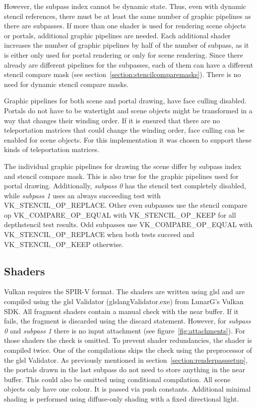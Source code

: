 However, the subpass index cannot be dynamic state. Thus, even with dynamic stencil references, there must be at least the same number of graphic pipelines as there are subpasses. If more than one shader is used for rendering scene objects or portals, additional graphic pipelines are needed. Each additional shader increases the number of graphic pipelines by half of the number of subpass, as it is either only used for portal rendering or only for scene rendering. Since there already are different pipelines for the subpasses, each of them can have a different stencil compare mask (see section~\ref{section:stencilcomparemasks}). There is no need for dynamic stencil compare masks.

Graphic pipelines for both scene and portal drawing, have face culling disabled. Portals do not have to be watertight and scene objects might be transformed in a way that changes their winding order. If it is ensured that there are no teleportation matrices that could change the winding order, face culling can be enabled for scene objects. For this implementation it was chosen to support these kinds of teleportation matrices.

The individual graphic pipelines for drawing the scene differ by subpass index and stencil compare mask. This is also true for the graphic pipelines used for portal drawing. Additionally, \textit{subpass 0} has the stencil test completely disabled, while \textit{subpass 1} uses an always succeeding test with VK\_STENCIL\_OP\_REPLACE. Other even subpasses use the stencil compare op VK\_COMPARE\_OP\_EQUAL with VK\_STENCIL\_OP\_KEEP for all depthstencil test results. Odd subpasses use VK\_COMPARE\_OP\_EQUAL with VK\_STENCIL\_OP\_REPLACE when both tests succeed and  VK\_STENCIL\_OP\_KEEP otherwise.

\subsection{Shaders}
Vulkan requires the SPIR-V format. The shaders are written using \gls{glsl} and are compiled using the \gls{glsl} Validator (glslangValidator.exe) from LunarG's Vulkan SDK. All fragment shaders contain a manual check with the near buffer. If it fails, the fragment is discarded using the discard statement. However, for \textit{subpass 0} and \textit{subpass 1} there is no input attachment (see figure~\ref{fig:attachments}). For those shaders the check is omitted. To prevent shader redundancies, the shader is compiled twice. One of the compilations skips the check using the preprocessor of the \gls{glsl} Validator. As previously mentioned in section~\ref{section:renderpasssetup}, the portals drawn in the last subpass do not need to store anything in the near buffer. This could also be omitted using conditional compilation. All scene objects only have one colour. It is passed via push constants. Additional minimal shading is performed using diffuse-only shading with a fixed directional light.


